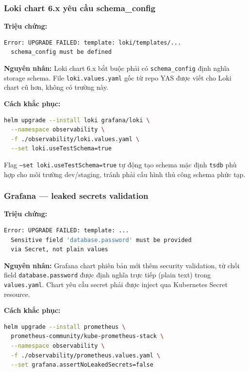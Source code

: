 \subsubsection{Loki chart 6.x yêu cầu schema\_config}

\textbf{Triệu chứng:}

\begin{lstlisting}[language=bash]
Error: UPGRADE FAILED: template: loki/templates/...
  schema_config must be defined
\end{lstlisting}

\textbf{Nguyên nhân:} Loki chart 6.x bắt buộc phải có \texttt{schema\_config} định nghĩa storage schema. File \texttt{loki.values.yaml} gốc từ repo YAS được viết cho Loki chart cũ hơn, không có trường này.

\textbf{Cách khắc phục:}

\begin{lstlisting}[language=bash]
helm upgrade --install loki grafana/loki \
  --namespace observability \
  -f ./observability/loki.values.yaml \
  --set loki.useTestSchema=true
\end{lstlisting}

Flag \texttt{--set loki.useTestSchema=true} tự động tạo schema mặc định \texttt{tsdb} phù hợp cho môi trường dev/staging, tránh phải cấu hình thủ công schema phức tạp.

\subsubsection{Grafana — leaked secrets validation}

\textbf{Triệu chứng:}

\begin{lstlisting}[language=bash]
Error: UPGRADE FAILED: template: ...
  Sensitive field 'database.password' must be provided
  via Secret, not plain values
\end{lstlisting}

\textbf{Nguyên nhân:} Grafana chart phiên bản mới thêm security validation, từ chối field \texttt{database.password} được định nghĩa trực tiếp (plain text) trong \texttt{values.yaml}. Chart yêu cầu secret phải được inject qua Kubernetes Secret resource.

\textbf{Cách khắc phục:}

\begin{lstlisting}[language=bash]
helm upgrade --install prometheus \
  prometheus-community/kube-prometheus-stack \
  --namespace observability \
  -f ./observability/prometheus.values.yaml \
  --set grafana.assertNoLeakedSecrets=false
\end{lstlisting}

